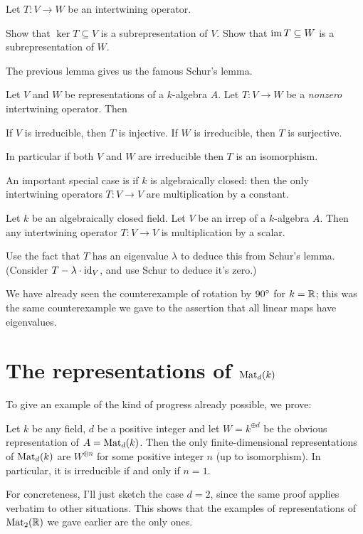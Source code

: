 \begin{exercise}
	Let $T : V \to W$ be an intertwining operator.
	\begin{enumerate}[(a)]
		\ii Show that $\ker T \subseteq V$ is a subrepresentation of $V$.
		\ii Show that $\operatorname{im} T \subseteq W$ is a subrepresentation of $W$.
	\end{enumerate}
\end{exercise}

The previous lemma gives us the famous Schur's lemma.
\begin{theorem}
	Let $V$ and $W$ be representations of a $k$-algebra $A$.
	Let $T : V \to W$ be a \emph{nonzero} intertwining operator.
	Then
	\begin{enumerate}[(a)]
		\ii If $V$ is irreducible, then $T$ is injective.
		\ii If $W$ is irreducible, then $T$ is surjective.
	\end{enumerate}
	In particular if both $V$ and $W$ are irreducible then $T$
	is an isomorphism.
\end{theorem}
An important special case is if $k$ is algebraically closed:
then the only intertwining operators $T \colon V \to V$
are multiplication by a constant.
\begin{theorem}
	Let $k$ be an algebraically closed field.
	Let $V$ be an irrep of a $k$-algebra $A$.
	Then any intertwining operator $T \colon V \to V$ is multiplication by a scalar.
	\label{thm:schur_algclosed}
\end{theorem}
\begin{exercise}
	Use the fact that $T$ has an eigenvalue $\lambda$ to
	deduce this from Schur's lemma.
	(Consider $T - \lambda \cdot \mathrm{id}_V$, and use Schur to deduce it's zero.)
\end{exercise}
We have already seen the counterexample of rotation by $90^\circ$ for $k = \mathbb R$;
this was the same counterexample we gave to the assertion that all linear maps
have eigenvalues.

\section{The representations of $\mathrm{Mat}_d(k)$}
To give an example of the kind of progress already possible, we prove:
\begin{theorem}
	\label{thm:rep_1mat}
	Let $k$ be any field, $d$ be a positive integer and
	let $W = k^{\oplus d}$ be the obvious representation of $A = \mathrm{Mat}_d(k)$.
	Then the only finite-dimensional representations
	of $\mathrm{Mat}_d(k)$ are $W^{\oplus n}$
	for some positive integer $n$ (up to isomorphism).
	In particular, it is irreducible if and only if $n=1$.
\end{theorem}
For concreteness, I'll just sketch the case $d=2$,
since the same proof applies verbatim to other situations.
This shows that the examples of representations of $\mathrm{Mat}_2(\mathbb R)$
we gave earlier are the only ones.

